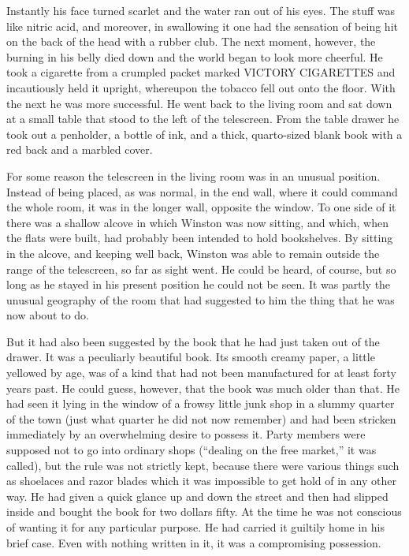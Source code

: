 Instantly his face turned scarlet and the water ran out of his eyes. The
stuff was like nitric acid, and moreover, in swallowing it one had the
sensation of being hit on the back of the head with a rubber club. The
next moment, however, the burning in his belly died down and the world
began to look more cheerful. He took a cigarette from a crumpled packet
marked \textsc{VICTORY CIGARETTES} and incautiously held it upright, whereupon
the tobacco fell out onto the floor. With the next he was more
successful. He went back to the living room and sat down at a small
table that stood to the left of the telescreen. From the table drawer he
took out a penholder, a bottle of ink, and a thick, quarto-sized blank
book with a red back and a marbled cover.

For some reason the telescreen in the living room was in an unusual
position. Instead of being placed, as was normal, in the end wall, where
it could command the whole room, it was in the longer wall, opposite the
window. To one side of it there was a shallow alcove in which Winston
was now sitting, and which, when the flats were built, had probably been
intended to hold bookshelves. By sitting in the alcove, and keeping well
back, Winston was able to remain outside the range of the telescreen, so
far as sight went. He could be heard, of course, but so long as he
stayed in his present position he could not be seen. It was partly the
unusual geography of the room that had suggested to him the thing that
he was now about to do.

But it had also been suggested by the book that he had just taken out of
the drawer. It was a peculiarly beautiful book. Its smooth creamy paper,
a little yellowed by age, was of a kind that had not been manufactured
for at least forty years past. He could guess, however, that the book
was much older than that. He had seen it lying in the window of a frowsy
little junk shop in a slummy quarter of the town (just what quarter he
did not now remember) and had been stricken immediately by an
overwhelming desire to possess it. Party members were supposed not to go
into ordinary shops (``dealing on the free market,'' it was called), but
the rule was not strictly kept, because there were various things such
as shoelaces and razor blades which it was impossible to get hold of in
any other way. He had given a quick glance up and down the street and
then had slipped inside and bought the book for two dollars fifty. At
the time he was not conscious of wanting it for any particular purpose.
He had carried it guiltily home in his brief case. Even with nothing
written in it, it was a compromising possession.

